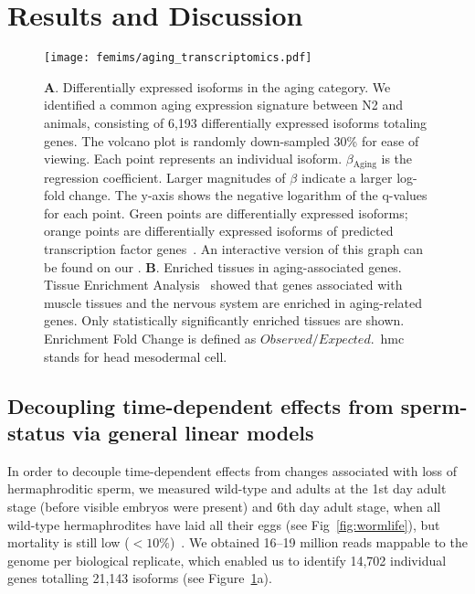 \section{Results and Discussion}
\begin{figure}[htbp]
  \renewcommand{\familydefault}{\sfdefault}\normalfont{}
  \centering
  \texttt{[image: femims/aging\_transcriptomics.pdf]}
  \caption{
    \textbf{A}. Differentially expressed isoforms in the aging category.
    We identified a common aging expression signature between N2 and
    \fog{} animals, consisting of 6,193 differentially expressed isoforms
    totaling \agen{} genes. The volcano plot is randomly down-sampled 30\% for
    ease of viewing. Each point represents an individual isoform.
    $\beta{}_\mathrm{Aging}$ is the regression coefficient. Larger magnitudes of
    $\beta$ indicate a larger log-fold change. The y-axis shows the negative
    logarithm of the q-values for each point. Green points are differentially
    expressed isoforms; orange points are differentially expressed isoforms of
    predicted transcription factor genes~\citep{Reece-Hoyes2005}. An interactive
    version of this graph can be found on our \webref{}.
    \textbf{B}. Enriched tissues in aging-associated genes. Tissue
    Enrichment Analysis~\citep{Angeles-Albores2016} showed that genes associated
    with muscle tissues and the nervous system are enriched in aging-related
    genes. Only statistically significantly enriched tissues are shown.
    Enrichment Fold Change is defined as $Observed/Expected$.\ hmc stands for
    head mesodermal cell.
  }
\label{fig:agingtranscriptome}
\end{figure}

\subsection*{Decoupling time-dependent effects from sperm-status via general
linear models}
\label{sub:Transcriptomics}
In order to decouple time-dependent effects from changes associated with loss of
hermaphroditic sperm, we measured wild-type and \fog{} adults at the 1st day
adult stage (before visible embryos were present) and 6th day adult stage, when
all wild-type hermaphrodites have laid all their eggs (see
Fig~\ref{fig:wormlife}), but mortality is still low
($<10\%$)~\citep{Stroustrup2013}.  We obtained 16--19 million reads mappable to
the \cel{} genome per biological replicate, which enabled us to identify 14,702
individual genes totalling 21,143 isoforms (see
Figure~\ref{fig:agingtranscriptome}a).

